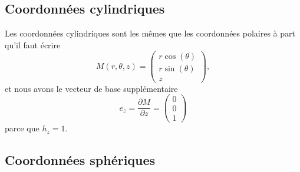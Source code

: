 \subsection{Coordonnées cylindriques}

Les coordonnées cylindriques sont les mêmes que les coordonnées polaires à part qu'il faut écrire
\begin{equation}
	M(r,\theta,z)=\begin{pmatrix}
		r\cos(\theta) \\
		r\sin(\theta) \\
		z
	\end{pmatrix},
\end{equation}
et nous avons le vecteur de base supplémentaire
\begin{equation}
	e_z=\frac{ \partial M }{ \partial z }=\begin{pmatrix}
		0 \\
		0 \\
		1
	\end{pmatrix}
\end{equation}
parce que \( h_z=1\).

\subsection{Coordonnées sphériques}

